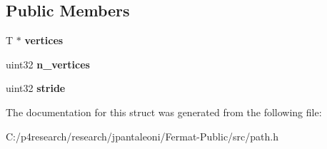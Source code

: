 \subsection*{Public Members}
\begin{DoxyCompactItemize}
\item 
\mbox{\label{struct_path_cache_ad5987d28ab38e53e5d09f9bb180224ea}} 
T $\ast$ {\bfseries vertices}
\item 
\mbox{\label{struct_path_cache_a24c1ff4a515806d5d22483608b884c98}} 
uint32 {\bfseries n\+\_\+vertices}
\item 
\mbox{\label{struct_path_cache_a8384ef9835a62866088a5fd57a5dbbbe}} 
uint32 {\bfseries stride}
\end{DoxyCompactItemize}


The documentation for this struct was generated from the following file\+:\begin{DoxyCompactItemize}
\item 
C\+:/p4research/research/jpantaleoni/\+Fermat-\/\+Public/src/path.\+h\end{DoxyCompactItemize}
